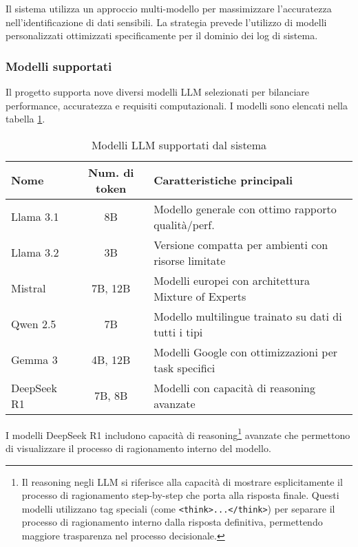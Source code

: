\documentclass[12pt]{report}
\begin{document}
Il sistema utilizza un approccio multi-modello per massimizzare l'accuratezza nell'identificazione di dati sensibili. La strategia prevede l'utilizzo di modelli personalizzati ottimizzati specificamente per il dominio dei log di sistema.

\subsubsection{Modelli supportati}
Il progetto supporta nove diversi modelli LLM selezionati per bilanciare performance, accuratezza e requisiti computazionali. I modelli sono elencati nella tabella \ref{tab:modelli_llm}.

\begin{table}[h!]
    \centering
    \begin{tabular}{|l|c|l|}
        \hline
        \textbf{Nome} & \textbf{Num. di token} & \textbf{Caratteristiche principali} \\ \hline
        Llama 3.1 & 8B & Modello generale con ottimo rapporto qualità/perf. \\ \hline
        Llama 3.2 & 3B & Versione compatta per ambienti con risorse limitate \\ \hline
        Mistral & 7B, 12B & Modelli europei con architettura Mixture of Experts \\ \hline
        Qwen 2.5 & 7B & Modello multilingue trainato su dati di tutti i tipi \\ \hline
        Gemma 3 & 4B, 12B & Modelli Google con ottimizzazioni per task specifici \\ \hline
        DeepSeek R1 & 7B, 8B & Modelli con capacità di reasoning avanzate \\ \hline
    \end{tabular}
    \caption{Modelli LLM supportati dal sistema}
    \label{tab:modelli_llm}
\end{table}

I modelli DeepSeek R1 includono capacità di reasoning\footnote{Il reasoning negli LLM si riferisce alla capacità di mostrare esplicitamente il processo di ragionamento step-by-step che porta alla risposta finale. Questi modelli utilizzano tag speciali (come \texttt{<think>...</think>}) per separare il processo di ragionamento interno dalla risposta definitiva, permettendo maggiore trasparenza nel processo decisionale.} avanzate che permettono di visualizzare il processo di ragionamento interno del modello.

\end{document}
